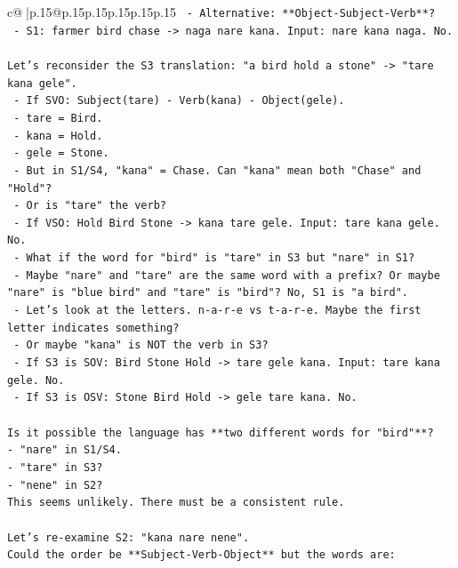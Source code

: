 \documentclass{article}
\begin{document}
{\begin{supertabular}{c@{$\;$}|p{.15\linewidth}@{}p{.15\linewidth}p{.15\linewidth}p{.15\linewidth}p{.15\linewidth}p{.15\linewidth}}
{{{\texttt{  {-} Alternative: **Object{-}Subject{-}Verb**?} \\
\texttt{    {-} S1: farmer bird chase {-}> naga nare kana. Input: nare kana naga. No.} \\
\\ 
\texttt{Let's reconsider the S3 translation: "a bird hold a stone" {-}> "tare kana gele".} \\
\texttt{  {-} If SVO: Subject(tare) {-} Verb(kana) {-} Object(gele).} \\
\texttt{    {-} tare = Bird.} \\
\texttt{    {-} kana = Hold.} \\
\texttt{    {-} gele = Stone.} \\
\texttt{  {-} But in S1/S4, "kana" = Chase. Can "kana" mean both "Chase" and "Hold"?} \\
\texttt{  {-} Or is "tare" the verb?} \\
\texttt{    {-} If VSO: Hold Bird Stone {-}> kana tare gele. Input: tare kana gele. No.} \\
\texttt{  {-} What if the word for "bird" is "tare" in S3 but "nare" in S1?} \\
\texttt{    {-} Maybe "nare" and "tare" are the same word with a prefix? Or maybe "nare" is "blue bird" and "tare" is "bird"? No, S1 is "a bird".} \\
\texttt{    {-} Let's look at the letters. n{-}a{-}r{-}e vs t{-}a{-}r{-}e. Maybe the first letter indicates something?} \\
\texttt{    {-} Or maybe "kana" is NOT the verb in S3?} \\
\texttt{      {-} If S3 is SOV: Bird Stone Hold {-}> tare gele kana. Input: tare kana gele. No.} \\
\texttt{      {-} If S3 is OSV: Stone Bird Hold {-}> gele tare kana. No.} \\
\\ 
\texttt{Is it possible the language has **two different words for "bird"**?} \\
\texttt{{-} "nare" in S1/S4.} \\
\texttt{{-} "tare" in S3?} \\
\texttt{{-} "nene" in S2?} \\
\texttt{This seems unlikely. There must be a consistent rule.} \\
\\ 
\texttt{Let's re{-}examine S2: "kana nare nene".} \\
\texttt{Could the order be **Subject{-}Verb{-}Object** but the words are:} \\
}}}
\end{supertabular}}
\end{document}
